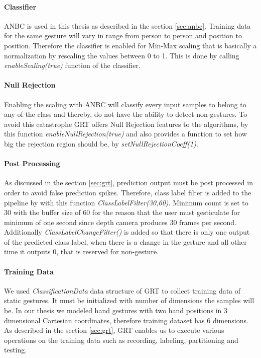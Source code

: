 \paragraph*{Classifier} ANBC is used in this thesis as described in the section \ref{sec:anbc}. Training data for the same gesture will vary in range from person to person and position to position. Therefore the classifier is enabled for Min-Max scaling that is basically a normalization by rescaling the values between 0 to 1. This is done by calling \textit{enableScaling(true)} function of the classifier.

\paragraph*{Null Rejection} Enabling the scaling with ANBC will classify every input samples to belong to any of the class and thereby, do not have the ability to detect non-gestures. To avoid this catastrophe GRT offers Null Rejection features to the algorithms, by this function \textit{enableNullRejection(true)} and also provides a function to set how big the rejection region should be, by \textit{setNullRejectionCoeff(1)}.

\paragraph*{Post Processing} As discussed in the section \ref{sec:grt}, prediction output must be post processed in order to avoid false prediction spikes. Therefore, class label filter is added to the pipeline by with this function \textit{ClassLabelFilter(30,60)}. Minimum count is set to 30 with the buffer size of 60 for the reason that the user must gesticulate for minimum of one second since depth camera produces 30 frames per second. Additionally \textit{ClassLabelChangeFilter()} is added so that there is only one output of the predicted class label, when there is a change in the gesture and all other time it outputs 0, that is reserved for non-gesture.

\paragraph*{Training Data} We used \textit{ClassificationData} data structure of GRT to collect training data of static gestures. It must be initialized with number of dimensions the samples will be. In our thesis we modeled hand gestures with two hand positions in 3 dimensional Cartesian coordinates, therefore training dataset has 6 dimensions. As described in the section \ref{sec:grt}, GRT enables us to execute various operations on the training data such as recording, labeling, partitioning and testing. 

